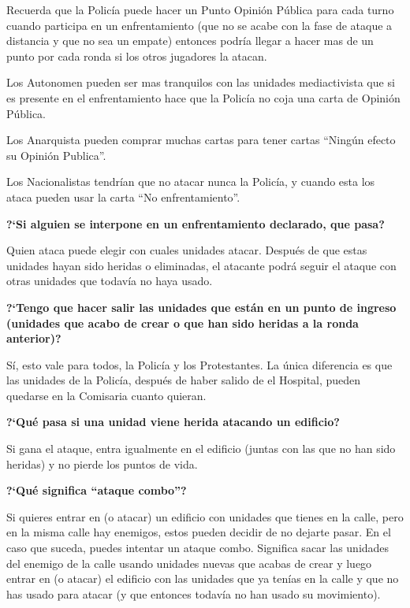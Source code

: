 \documentclass[a4paper,13pt]{scrartcl}
\begin{document}
Recuerda que la Polic\'ia puede hacer un Punto Opini\'on P\'ublica para cada turno cuando participa en un enfrentamiento
(que no se acabe con la fase de ataque a distancia y que no sea un empate) entonces podr\'ia llegar a hacer mas de un
punto por cada ronda si los otros jugadores la atacan.

Los Autonomen pueden ser mas tranquilos con las unidades mediactivista que si es presente en el enfrentamiento hace que
la Polic\'ia no coja una carta de Opini\'on P\'ublica.

Los Anarquista pueden comprar muchas cartas para tener cartas ``Ning\'un efecto su Opini\'on Publica''.

Los Nacionalistas tendr\'ian que no atacar nunca la Polic\'ia, y cuando esta los ataca pueden usar la carta ``No
enfrentamiento''.
\bigskip

{\bfseries
?`Si alguien se interpone en un enfrentamiento declarado, que pasa?} \nopagebreak

Quien ataca puede elegir con cuales unidades atacar. Despu\'es de que estas unidades hayan sido heridas o eliminadas, el
atacante podr\'a seguir el ataque con otras unidades que todav\'ia no haya usado.
\bigskip

{\bfseries
?`Tengo que hacer salir las unidades que est\'an en un punto de ingreso (unidades que acabo de crear o que han sido
heridas a la ronda anterior)?} \nopagebreak

S\'i, esto vale para todos, la Polic\'ia y los Protestantes. La \'unica diferencia es que las unidades de la Polic\'ia,
despu\'es de haber salido de el Hospital, pueden quedarse en la Comisaria cuanto quieran.
\bigskip

{\bfseries
?`Qu\'e pasa si una unidad viene herida atacando un edificio?} \nopagebreak

Si gana el ataque, entra igualmente en el edificio (juntas con las que no han sido heridas) y no pierde los puntos de
vida.
\bigskip

{\bfseries
?`Qu\'e significa ``ataque combo''?} \nopagebreak

Si quieres entrar en (o atacar) un edificio con unidades que tienes en la calle, pero en la misma calle hay enemigos,
estos pueden decidir de no dejarte pasar. En el caso que suceda, puedes intentar un ataque combo. Significa sacar las
unidades del enemigo de la calle usando unidades nuevas que acabas de crear y luego entrar en (o atacar) el edificio
con las unidades que ya ten\'ias en la calle y que no has usado para atacar (y que entonces todav\'ia no han usado su
movimiento).
\end{document}
